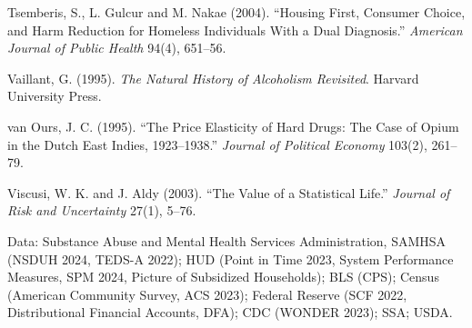 \documentclass[10pt]{article}
\begin{document}
{\begin{list}{}{\setlength{\leftmargin}{1.5em}\setlength{\itemindent}{-1.5em}\setlength{\itemsep}{0.35em}\setlength{\parsep}{0em}}
\item Tsemberis, S., L. Gulcur and M. Nakae (2004). ``Housing First, Consumer Choice, and Harm Reduction for Homeless Individuals With a Dual Diagnosis.'' \emph{American Journal of Public Health} 94(4), 651--56.
\item Vaillant, G. (1995). \emph{The Natural History of Alcoholism Revisited}. Harvard University Press.
\item van Ours, J. C. (1995). ``The Price Elasticity of Hard Drugs: The Case of Opium in the Dutch East Indies, 1923--1938.'' \emph{Journal of Political Economy} 103(2), 261--79.
\item Viscusi, W. K. and J. Aldy (2003). ``The Value of a Statistical Life.'' \emph{Journal of Risk and Uncertainty} 27(1), 5--76.
\end{list}

\noindent Data: Substance Abuse and Mental Health Services Administration, SAMHSA (NSDUH 2024, TEDS-A 2022); HUD (Point in Time 2023, System Performance Measures, SPM 2024, Picture of Subsidized Households); BLS (CPS); Census (American Community Survey, ACS 2023); Federal Reserve (SCF 2022, Distributional Financial Accounts, DFA); CDC (WONDER 2023); SSA; USDA.\par}
\end{document}
